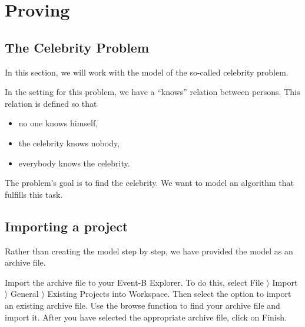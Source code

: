 \section{Proving}
\label{tut_proving}


\subsection{The Celebrity Problem}
\label{tut_celebrity_problem}

In this section, we will work with the model of the so-called celebrity problem.


In the setting for this problem, we have a ``knows'' relation between persons.
This relation is defined so that

\begin{itemize}
	\item no one knows himself,
	\item the celebrity knows nobody,
	\item everybody knows the celebrity.
\end{itemize}    

The problem's goal is to find the celebrity. We want to model an algorithm that fulfills this task.

\subsection{Importing a project}
\label{tut_import_project}

Rather than creating the model step by step, we have provided the model as an archive file.


Import the archive file  to your Event-B Explorer. To do this, select \textsf{File $\rangle $ Import $\rangle $ General $\rangle $ Existing Projects into Workspace}. Then select the option to import an existing archive file. Use the browse function to find your archive file and import it. After you have selected the appropriate archive file, click on \textsf{Finish}.

